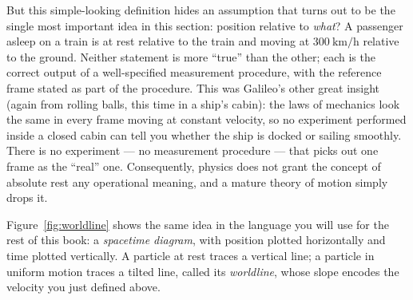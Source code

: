 But this simple-looking definition hides an assumption that turns out to be the single most important idea in this section: position relative to \emph{what}? A passenger asleep on a train is at rest relative to the train and moving at \(300\ \text{km/h}\) relative to the ground. Neither statement is more ``true'' than the other; each is the correct output of a well-specified measurement procedure, with the reference frame stated as part of the procedure. This was Galileo's other great insight (again from rolling balls, this time in a ship's cabin): the laws of mechanics look the same in every frame moving at constant velocity, so no experiment performed inside a closed cabin can tell you whether the ship is docked or sailing smoothly. There is no experiment --- no measurement procedure --- that picks out one frame as the ``real'' one. Consequently, physics does not grant the concept of absolute rest any operational meaning, and a mature theory of motion simply drops it.

Figure~\ref{fig:worldline} shows the same idea in the language you will use for the rest of this book: a \emph{spacetime diagram}, with position plotted horizontally and time plotted vertically. A particle at rest traces a vertical line; a particle in uniform motion traces a tilted line, called its \emph{worldline}, whose slope encodes the velocity you just defined above.

